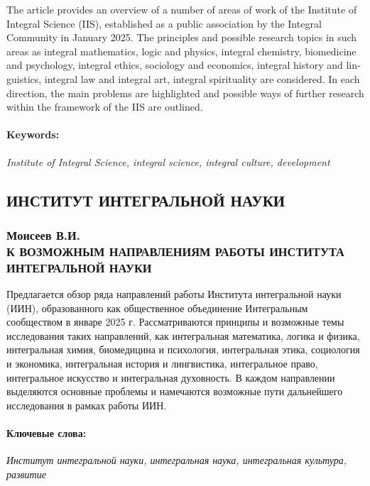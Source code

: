 \begin{english}
    The article provides an overview of a number of areas of work of the Institute of Integral Science (IIS), established as a public association by the Integral Community in January 2025. The principles and possible research topics in such areas as integral mathematics, logic and physics, integral chemistry, biomedicine and psychology, integral ethics, sociology and economics, integral history and linguistics, integral law and integral art, integral spirituality are considered. In each direction, the main problems are highlighted and possible ways of further research within the framework of the IIS are outlined.

    \paragraph{Keywords:} \textit{Institute of Integral Science, integral science, integral culture, development}
    \end{english}
\else
    \subsection{ИНСТИТУТ ИНТЕГРАЛЬНОЙ НАУКИ}
    \label{subsec:moiseev-ru}

    \subsubsection{Моисеев В.И. \\ К ВОЗМОЖНЫМ НАПРАВЛЕНИЯМ РАБОТЫ ИНСТИТУТА ИНТЕГРАЛЬНОЙ НАУКИ}
    \label{subsubsec:moiseev-title-ru}

    Предлагается обзор ряда направлений работы Института интегральной науки (ИИН), образованного как общественное объединение Интегральным сообществом в январе 2025 г. Рассматриваются принципы и возможные темы исследования таких направлений, как интегральная математика, логика и физика, интегральная химия, биомедицина и психология, интегральная этика, социология и экономика, интегральная история и лингвистика, интегральное право, интегральное искусство и интегральная духовность. В каждом направлении выделяются основные проблемы и намечаются возможные пути дальнейшего исследования в рамках работы ИИН. 

    \paragraph{Ключевые слова:} \textit{Институт интегральной науки, интегральная наука, интегральная культура, развитие}

